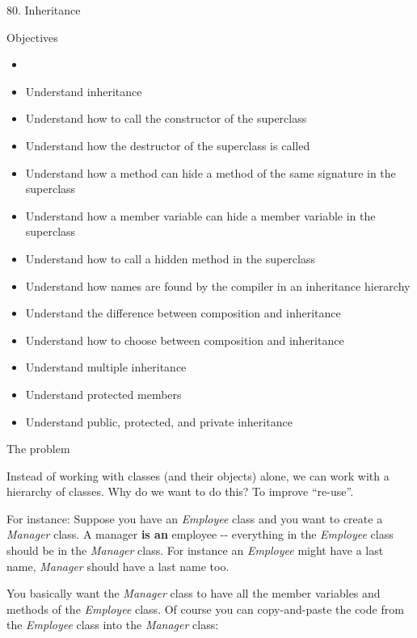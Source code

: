 \documentclass[
]{article}
\author{}
\date{}
\providecommand{\tightlist}{%
  \setlength{\itemsep}{0pt}\setlength{\parskip}{0pt}}
\begin{document}
80. Inheritance

Objectives

\begin{itemize}
\tightlist
\item
\item
  Understand inheritance
\item
  Understand how to call the constructor of the superclass
\item
  Understand how the destructor of the superclass is called
\item
  Understand how a method can hide a method of the same signature in the
  superclass
\item
  Understand how a member variable can hide a member variable in the
  superclass
\item
  Understand how to call a hidden method in the superclass
\item
  Understand how names are found by the compiler in an inheritance
  hierarchy
\item
  Understand the difference between composition and inheritance
\item
  Understand how to choose between composition and inheritance
\item
  Understand multiple inheritance
\item
  Understand protected members
\item
  Understand public, protected, and private inheritance
\end{itemize}

The problem

Instead of working with classes (and their objects) alone, we can work
with a hierarchy of classes. Why do we want to do this? To improve
``re-use''.

For instance: Suppose you have an \emph{Employee} class and you want to
create a \emph{Manager} class. A manager \textbf{is an} employee -\/-
everything in the \emph{Employee} class should be in the \emph{Manager}
class. For instance an \emph{Employee} might have a last name,
\emph{Manager} should have a last name too.

You basically want the \emph{Manager} class to have all the member
variables and methods of the \emph{Employee} class. Of course you can
copy-and-paste the code from the \emph{Employee }class into the
\emph{Manager }class:
\end{document}
